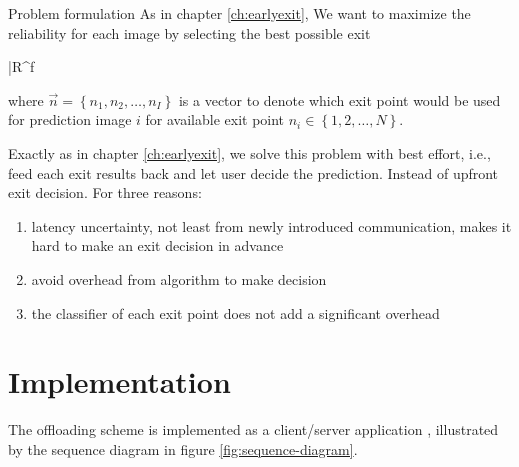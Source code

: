 \begin{enumdescript}
		\item[Problem formulation]   As in chapter \ref{ch:earlyexit},  We want to maximize the reliability for each image by selecting the best possible exit
		
		
		\begin{maxi}
			{}{\bar{R}^f}
			{}{}
		\end{maxi}
	
		where $ \vec{n} = \left\{ n_1, n_2, \dots, n_I \right\}$ is a vector to denote which exit point would be used for prediction image $ i $ for available exit point $ n_i \in \left\{1,2, \dots, N\right\} $.
		
		Exactly as in chapter \ref{ch:earlyexit}, we solve this problem with best effort, i.e., feed each exit results back and let user decide the prediction. Instead of upfront exit decision. For three reasons:
		\begin{enumerate}
			\item latency uncertainty, not least from newly introduced communication, makes it hard to make an exit decision in advance
			\item avoid overhead from algorithm to make decision
			\item the classifier of each exit point does not add a significant overhead
		\end{enumerate}
		
			
	\end{enumdescript}  

\section{Implementation} \label{sec:edge-implementation}

The offloading scheme is implemented as a client/server application \cite{sommerville_software_2015}, illustrated by the sequence diagram in figure \ref{fig:sequence-diagram}. 


